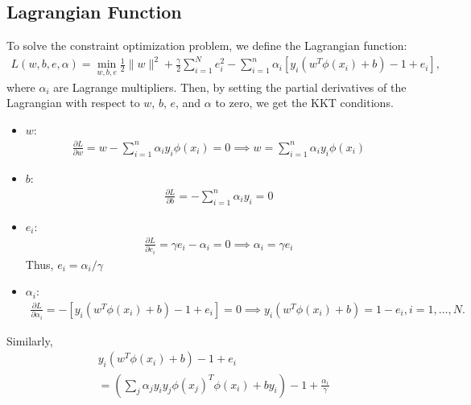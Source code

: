 \subsection{Lagrangian Function}
To solve the constraint optimization problem, we define the Lagrangian function: 
\begin{align*}
	L(w, b, e, \alpha) = \min_{w, b, e} \frac{1}{2} \lVert w\rVert^2 + \frac{\gamma}{2} \sum_{i=1}^N e_i^2 - \sum_{i=1}^n \alpha_i \left[ y_i (w^T \phi(x_i) + b) - 1 + e_i \right],
\end{align*}
where \( \alpha_i \) are Lagrange multipliers. Then, by setting the partial derivatives of the Lagrangian with respect to $w$, $b$, $e$, and $\alpha$ to zero, we get the KKT conditions.

\begin{itemize}
	\item $w$: 
		\begin{align*}
		   \frac{\partial L}{\partial w} = w - \sum_{i=1}^n \alpha_i y_i \phi(x_i) = 0 \implies w = \sum_{i=1}^n \alpha_i y_i \phi(x_i)
		\end{align*}
	\item $b$:
		\begin{align*}
		   \frac{\partial L}{\partial b} = -\sum_{i=1}^n \alpha_i y_i = 0
		\end{align*}
\item $e_i$:
	\begin{align*}
	   \frac{\partial L}{\partial e_i} = \gamma e_i - \alpha_i = 0 \implies \alpha_i = \gamma e_i
	\end{align*}
	Thus, $e_i = \alpha_i/\gamma$
\item $\alpha_i$:
	\begin{align*}
	   \frac{\partial L}{\partial \alpha_i} = - \left[ y_i (w^T \phi(x_i) + b) - 1 + e_i \right] = 0 \implies y_i (w^T \phi(x_i) + b) = 1 - e_i, i=1,\dots, N.
	\end{align*}
\end{itemize}

Similarly, 
\begin{align*}
	&y_i (w^T \phi(x_i) + b) - 1 + e_i\\
	&=  \left(\sum_j \alpha_j y_iy_j \phi(x_j)^T \phi(x_i) + by_i\right) - 1 + \frac{\alpha_i}{\gamma}
\end{align*}

